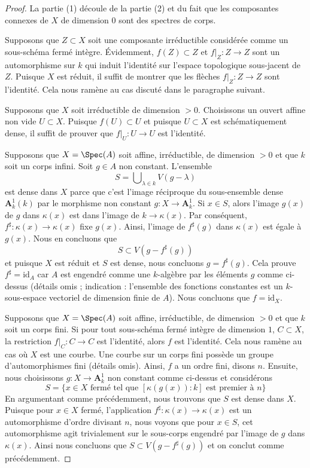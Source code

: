 \begin{proof}
La partie (1) découle de la partie (2) et du fait que les
composantes connexes de $X$ de dimension $0$ sont des spectres de corps.

\medskip\noindent
Supposons que $Z \subset X$ soit une composante irréductible considérée
comme un sous-schéma fermé intègre. Évidemment, $f(Z) \subset Z$
et $f|_Z : Z \to Z$ sont un automorphisme sur $k$ qui induit
l'identité sur l'espace topologique sous-jacent de $Z$.
Puisque $X$ est réduit, il suffit de montrer que les flèches $f|_Z : Z \to Z$
sont l'identité. Cela nous ramène au cas discuté dans le paragraphe suivant.

\medskip\noindent
Supposons que $X$ soit irréductible de dimension $> 0$.
Choisissons un ouvert affine non vide $U \subset X$. Puisque
$f(U) \subset U$ et puisque $U \subset X$ est schématiquement
dense, il suffit de prouver que $f|_U : U \to U$ est l'identité.

\medskip\noindent
Supposons que $X = \Spec(A)$ soit affine, irréductible, de dimension $> 0$ et que
$k$ soit un corps infini. Soit $g \in A$ non constant. L'ensemble
$$
S = \bigcup\nolimits_{\lambda \in k} V(g - \lambda)
$$
est dense dans $X$ parce que c'est l'image réciproque du
sous-ensemble dense $\mathbf{A}^1_k(k)$ par le morphisme
non constant $g : X \to \mathbf{A}^1_k$. Si $x \in S$,
alors l'image $g(x)$ de $g$ dans $\kappa(x)$ est dans
l'image de $k \to \kappa(x)$. Par conséquent, $f^\sharp :
\kappa(x) \to \kappa(x)$ fixe $g(x)$. Ainsi, l'image de
$f^\sharp(g)$ dans $\kappa(x)$ est égale à $g(x)$. Nous en concluons que
$$
S \subset V(g - f^\sharp(g))
$$
et puisque $X$ est réduit et $S$ est dense, nous concluons
$g=f^\sharp(g)$. Cela prouve $f^\sharp = \text{id}_A$ car $A$ est
engendré comme une $k$-algèbre par les éléments $g$ comme ci-dessus (détails
omis ; indication : l'ensemble des fonctions constantes est un $k$-sous-espace
vectoriel de dimension finie de $A$). Nous concluons que $f = \text{id}_X$.

\medskip\noindent
Supposons que $X = \Spec(A)$ soit affine, irréductible, de
dimension $> 0$ et que $k$ soit un corps fini. Si pour tout
sous-schéma fermé intègre de dimension $1$, $C \subset X$, la
restriction $f|_C : C \to C$ est l'identité, alors $f$ est
l'identité. Cela nous ramène au cas où $X$ est une courbe. Une courbe
sur un corps fini possède un groupe d'automorphismes fini (détails
omis). Ainsi, $f$ a un ordre fini, disons $n$. Ensuite, nous choisissons
$g : X \to \mathbf{A}^1_k$ non constant comme ci-dessus et considérons
$$
S = \{x \in X\text{ fermé tel que }[\kappa(g(x)) : k]
\text{ est premier à }n\}
$$
En argumentant comme précédemment, nous trouvons que
$S$ est dense dans $X$. Puisque pour $x \in X$ fermé,
l'application $f^\sharp : \kappa(x) \to \kappa(x)$
est un automorphisme d'ordre divisant $n$, nous
voyons que pour $x \in S$, cet automorphisme agit
trivialement sur le sous-corps engendré par l'image de
$g$ dans $\kappa(x)$. Ainsi nous concluons que $S \subset
V(g - f^\sharp(g))$ et on conclut comme précédemment.
\end{proof}






